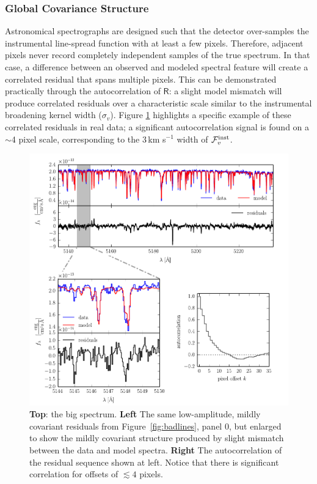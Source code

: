 \documentclass[iop,floatfix]{emulateapj}
\newcommand{\vR}{\mathsf{R}}
\begin{document}
\subsubsection{Global Covariance Structure} \label{subsec:global_covariance}

Astronomical spectrographs are designed such that the detector over-samples the instrumental 
line-spread function with at least a few pixels.  Therefore, adjacent pixels never record 
completely independent samples of the true spectrum.  In that case, a difference between an 
observed and modeled spectral feature will create a correlated residual that spans multiple 
pixels.  This can be demonstrated practically through the autocorrelation of $\vR$: a slight model 
mismatch will produce correlated residuals over a characteristic scale similar to the instrumental
broadening kernel width ($\sigma_v$).  Figure \ref{fig:class0} highlights a specific example of 
these correlated residuals in real data; a significant autocorrelation signal is found on a $\sim$4 
pixel scale, corresponding to the 3\,km s$^{-1}$ width of $\mathcal{F}_v^{\rm inst}$.  

\begin{figure}[!htb]
\begin{center}
  \includegraphics{correlation_panel.pdf}
  \caption{\textbf{Top}: the big spectrum. \textbf{Left} The same low-amplitude, mildly covariant residuals from Figure~\ref{fig:badlines}, panel 0, but enlarged to show the mildly covariant structure produced by slight mismatch between the data and model spectra.   
  \textbf{Right} The autocorrelation of the residual sequence shown at left. Notice that there is significant correlation for offsets of $\lesssim 4$ pixels.}
\label{fig:class0}
\end{center}
\end{figure}
\end{document}
